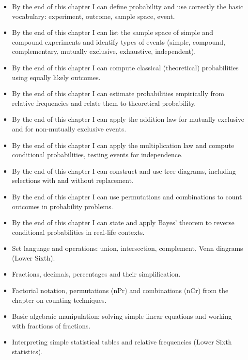 \documentclass[11pt]{article}
\begin{document}
\begin{objectifs}
\begin{itemize}
\item By the end of this chapter I can define probability and use correctly the basic vocabulary: experiment, outcome, sample space, event.
\item By the end of this chapter I can list the sample space of simple and compound experiments and identify types of events (simple, compound, complementary, mutually exclusive, exhaustive, independent).
\item By the end of this chapter I can compute classical (theoretical) probabilities using equally likely outcomes.
\item By the end of this chapter I can estimate probabilities empirically from relative frequencies and relate them to theoretical probability.
\item By the end of this chapter I can apply the addition law for mutually exclusive and for non-mutually exclusive events.
\item By the end of this chapter I can apply the multiplication law and compute conditional probabilities, testing events for independence.
\item By the end of this chapter I can construct and use tree diagrams, including selections with and without replacement.
\item By the end of this chapter I can use permutations and combinations to count outcomes in probability problems.
\item By the end of this chapter I can state and apply Bayes' theorem to reverse conditional probabilities in real-life contexts.
\end{itemize}
\end{objectifs}

\begin{prerequis}
\begin{itemize}
\item Set language and operations: union, intersection, complement, Venn diagrams (Lower Sixth).
\item Fractions, decimals, percentages and their simplification.
\item Factorial notation, permutations (nPr) and combinations (nCr) from the chapter on counting techniques.
\item Basic algebraic manipulation: solving simple linear equations and working with fractions of fractions.
\item Interpreting simple statistical tables and relative frequencies (Lower Sixth statistics).
\end{itemize}
\end{prerequis}
\end{document}
